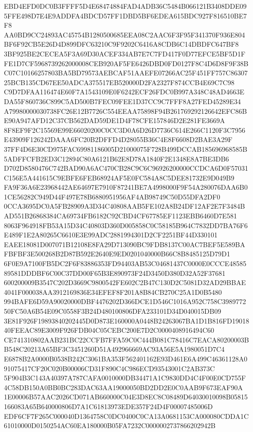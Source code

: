 \documentclass[UTF8,fontset=fandol,zihao=-4,a4paper]{ctexart}
\begin{document}
{{EBD4EFD0DC0B3FFFF5D4E68474884FAD4ADB36C5484B066121B3408DDE095FFE498D7E4E9ADDFA4BDCD57FF1DBD5BF6EDEA615BDC927F816510BE7F8
AA0BD9CC24893AC45754B1280500685EEA08C2AAC6F3F95F341370F936E804BF6F92CB5E26D4D899DFC63210C9F9202C6416A8CDB6C14DBDFC647BF8
3BF925BE2CECEA5F3A69D30ACEF334AB7E7C7FD417F0D77EFCE5BF5D1FFE1D7CF5968739262000008CEB920AF5FE6426DBD0FD0127F8C4D6D8F9F38B
C07C10166257803BA5BD79573AEBCAF51AAEFE07266AC25F451FF757C8630725BCB135CD67EE50ADCA375517EB520000D2FA2327F874CCB4E69C7C98
C9D7DFAA116474E60F7A1543109E0F6242ECF26FDC0B997A348C48AD4663EDA55F860736C899C5AD500B7FEC09FEE1D37CC9C7FFF8A27FED45289E34
A79980000030738FC26E12B7726C554EEAA75898F94B261769292126642EFC86BE90A947AFD12C37CB562DAD59DE1D4F78CFE157846D2E281FE3669A
8F8EF9F2C15569E99E66020200C0CC3D0A6D26D7736C614E266C1120F3C7956E43909F126242DAAA6FC20B2DFFD4D28055B36C4E8F6608D2BAE3A29F
37FF4D6E30CD975FAC69981186005D21000075F728B499DCCAB185696968585B5ADFFCFB2ED3C12894C80A6121B62E8D78A1840F2E1348E8A7BE3DB6
D702D8580476C742BAD90A6AC470CB28C9C6C96926200000CCDCA6D0F57031C156E5A441615C9EBFE6FEB68924AF5E0FC584A8C5DEE81732E9D049B9
FA9F36A6E23968442AE64697E7910F87241BE7A4998000F9F54A280076DAA6B01CE56282C949D44F497E78B6880951956AF4AB98749C50D55DFA2DF0
0CCA3695DC0A5FB28909A3D34C40808AAB5FE102A8B24DF12AF2E7F3484BAD551B26868384CA69734FB6182C92CBD4CF67785EF1123EBB6460D7E581
8063F964918FB53A15D34C40803D360D005858C0C58185B964C7832DD7BA76F6E489F1E2A80265C6610E3E99ADC2881994301D2CF2251BF44D330101
EAEE18081D007071B12108E8FA29D713090BC9FDB8137C00AC7BEF5E589BAFBFBF3E500268B2D87B592E2640E9ED0201040000B66C8B8485125D79D1
6F0E9A7100FB5DC2F6F83886353FD94403AB53C04681437C0000E0CCCE4858589581DDDBF6C00C37DD00F65B3E890973F24D3450D380D32A52F37681
600200009B3547C202D3669C9800542FE602C2B47C130D2C5081D32AD29BBAE4041F000038AA3912169836E34EFEF8F201A8B84CB270C25A1D0B5480
994BAFE6D59A90020000DBF4476202D366DCE1D546C1016A952C758C398977250FC50A6B54E09C0558F3B24D480100806DFA233101D34D040015DB09
3E81F926F19893840202445D0D873E160000A0448B24263067BA1D1B816FD1901840FEEAC89E3009F926FDB04C05CEBC200E7D2C0000408916494C60
CE741310802AAB231BC22CCFB7FFA59C0C444B081C78416C7EACA80200003BB548C20213A65BF3C3451260D51A492966669AC93A56E5A1980051D7C4
E6878B2A0000B0538B242C3061BA353F562401162E93D461E6A499C46361128A091075417CF20C020B00006CD31F890C4C986ECD93543001C2AB373C
5F904B3C143A40397A787CAFA0010000DB34471A1C9830DD4C4F00E0CD755F4C58DB150A0BB0BC283DAC63AA19000050BD2DD2E0C0AAB9F673EAF90A
1E00006B57AAC2026CD071AB660000C04E3D8EC8C08489D64030010098B05815166083A65B640000806D7A1C61813973EDE357F24D4F00007485006D
EDF6CF7F265C000040D1364758C0DC0400C0CA13A0681153CA000080CDDA1C61010000D0150254AC60EA180000B05FA7232C0000002737866202942B
}}
\end{document}

